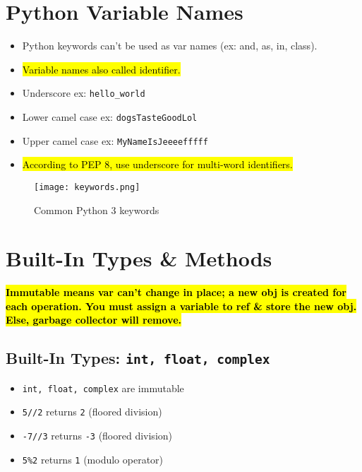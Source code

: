 \documentclass{article}
\begin{document}
\section{Python Variable Names}
    \begin{multicols}{2}
        \begin{itemize}
            \item Python keywords can't be used as var names (ex: and, as, in, class).
            \item \hl{Variable names also called identifier.}
            \item Underscore ex: \texttt{hello\_world}
            \item Lower camel case ex: \texttt{dogsTasteGoodLol}
            \item Upper camel case ex: \texttt{MyNameIsJeeeefffff}
            \item \hl{According to PEP 8, use underscore for multi-word identifiers.}
        \end{itemize}
    \end{multicols}

    \begin{figure}[!h]
        \begin{center}
            \texttt{[image: keywords.png]}
        \end{center}
    \vspace*{-5mm}
    \caption{Common Python 3 keywords}
    \end{figure}
    
\section{Built-In Types \& Methods}
\hl{\textbf{Immutable means var can't change in place; a new obj is created for each operation. You must assign a variable to ref \& store the new obj. Else, garbage collector will remove.}}
    \subsection{Built-In Types: \texttt{int, float, complex}}
    \begin{multicols}{2}
        \begin{itemize}
            \item \texttt{int, float, complex} are immutable
            \item \texttt{5//2} returns \texttt{2} (floored division)
            \item \texttt{-7//3} returns \texttt{-3} (floored division)
            \item \texttt{5\%2} returns \texttt{1} (modulo operator)
        \end{itemize}
    \end{multicols}
\end{document}
